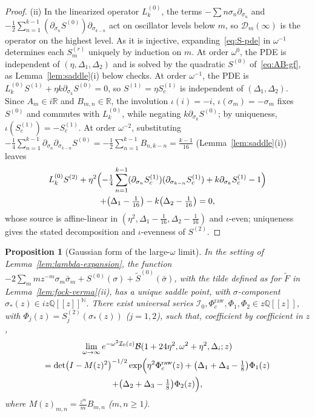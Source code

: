 \documentclass[twoside,10pt]{article}
\numberwithin{equation}{section}
\theoremstyle{slbody}
\newtheorem{proposition}[theorem]{Proposition}
\theoremstyle{definition}
\theoremstyle{remark}
\begin{document}
\begin{proof}
(ii) In the linearized operator \(L_k^{(0)}\), the terms
\(-\sum n\sigma_n\partial_{\sigma_n}\) and
\(-\frac12\sum_{n=1}^{k-1}(\partial_{\sigma_n}S^{(0)})\partial_{\sigma_{k-n}}\)
act on oscillator levels below \(m\), so \(\mathcal D_m(\infty)\) is the
operator on the highest level.  As it is injective, expanding~\eqref{eq:S-pde}
in \(\omega^{-1}\) determines each \(S^{(r)}_m\) uniquely by induction on
\(m\).  At order \(\omega^0\), the PDE is independent of
\((\eta,\Delta_1,\Delta_2)\) and is solved by the quadratic \(S^{(0)}\)
of~\eqref{eq:AB-gf}, as Lemma~\ref{lem:saddle}(i) below checks.  At order
\(\omega^{-1}\), the PDE is \(L_k^{(0)}S^{(1)}+\eta k\partial_{\sigma_k}S^{(0)}=0\),
so \(S^{(1)}=\eta S^{(1)}_c\) is independent of
\((\Delta_1,\Delta_2)\).  Since \(A_m\in i\mathbb R\) and
\(B_{m,n}\in\mathbb R\), the involution \(\iota(i)=-i\),
\(\iota(\sigma_m)=-\sigma_m\) fixes \(S^{(0)}\) and commutes with
\(L_k^{(0)}\), while negating \(k\partial_{\sigma_k}S^{(0)}\); by
uniqueness, \(\iota(S^{(1)}_c)=-S^{(1)}_c\).  At order
\(\omega^{-2}\), substituting
\(-\frac14\sum_{n=1}^{k-1}\partial_{\sigma_n}\partial_{\sigma_{k-n}}S^{(0)}
=-\frac12\sum_{n=1}^{k-1}B_{n,k-n}=\frac{k-1}{16}\) (Lemma~\ref{lem:saddle}(i))
leaves
\begin{multline*}
 L_k^{(0)}S^{(2)}
 +\eta^2\Bigl(-\tfrac14\sum_{n=1}^{k-1}(\partial_{\sigma_n}S^{(1)}_c)(\partial_{\sigma_{k-n}}S^{(1)}_c)
 +k\partial_{\sigma_k}S^{(1)}_c-1\Bigr)\\
 +\bigl(\Delta_1-\tfrac1{16}\bigr)-k\bigl(\Delta_2-\tfrac1{16}\bigr)=0,
\end{multline*}
whose source is affine-linear in
\((\eta^2,\Delta_1-\tfrac1{16},\Delta_2-\tfrac1{16})\) and \(\iota\)-even;
uniqueness gives the stated decomposition and \(\iota\)-evenness of
\(S^{(2)}\).
\end{proof}

\begin{proposition}[Gaussian form of the large-\(\omega\) limit]\label{prop:gaussian-limit}
In the setting of Lemma~\ref{lem:lambda-expansion}, the function
  \(-2\sum_m m z^{-m}\sigma_m\bar\sigma_m+S^{(0)}(\sigma)+\widetilde S^{(0)}(\bar\sigma)\),
  with the tilde defined as for \(\widetilde F\) in Lemma~\ref{lem:fock-verma}(ii),
  has a unique saddle point, with \(\sigma\)-component
  \(\sigma_*(z)\in iz\mathbb Q[[z]]^{\mathbb N}\).  There exist universal series
  \(\mathcal I_0,\Phi_c^{\mathrm{raw}},\Phi_1,\Phi_2\in z\mathbb Q[[z]]\),
  with \(\Phi_j(z)=S^{(2)}_j(\sigma_*(z))\) (\(j=1,2\)), such that,
  coefficient by coefficient in \(z\),
  \begin{multline}\label{eq:universal-limit}
   \lim_{\omega\to\infty}e^{-\omega^2\mathcal I_0(z)}
   \mathcal B(1+24\eta^2,\omega^2+\eta^2,\Delta_i;z)\\
   =\det\bigl(I-M(z)^2\bigr)^{-1/2}
    \exp\Bigl(\eta^2\Phi_c^{\mathrm{raw}}(z)
      +\bigl(\Delta_1+\Delta_4-\tfrac18\bigr)\Phi_1(z)\\
      +\bigl(\Delta_2+\Delta_3-\tfrac18\bigr)\Phi_2(z)\Bigr),
  \end{multline}
  where \(M(z)_{m,n}=\frac{z^m}{m}B_{m,n}\) (\(m,n\geq1\)).
\end{proposition}
\end{document}
